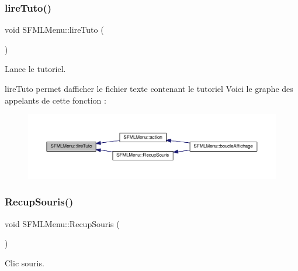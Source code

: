 \subsubsection{\texorpdfstring{lire\+Tuto()}{lireTuto()}}
{\footnotesize\ttfamily void S\+F\+M\+L\+Menu\+::lire\+Tuto (\begin{DoxyParamCaption}{ }\end{DoxyParamCaption})\hspace{0.3cm}{\ttfamily [private]}}



Lance le tutoriel. 

lire\+Tuto permet d\textquotesingle{}afficher le fichier texte contenant le tutoriel Voici le graphe des appelants de cette fonction \+:\nopagebreak
\begin{figure}[H]
\begin{center}
\leavevmode
\includegraphics[width=350pt]{class_s_f_m_l_menu_a4eda2cf8b00a4446674430cce575cbb5_icgraph}
\end{center}
\end{figure}
\mbox{\label{class_s_f_m_l_menu_aea4285a4b09f175d67fd96aa8456b213}} 
\subsubsection{\texorpdfstring{Recup\+Souris()}{RecupSouris()}}
{\footnotesize\ttfamily void S\+F\+M\+L\+Menu\+::\+Recup\+Souris (\begin{DoxyParamCaption}{ }\end{DoxyParamCaption})\hspace{0.3cm}{\ttfamily [private]}}



Clic souris. 

